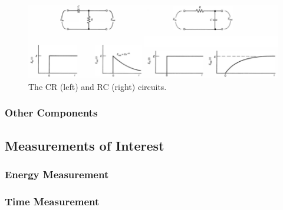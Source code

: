 \begin{figure}[ht]
    \centering
    \includegraphics[width=1.0\textwidth]{images/RC_CR_circuits.png}
    \caption{The CR (left) and RC (right) circuits.}
    \label{fig:RC_CR_circuits}
\end{figure}

\subsubsection{Other Components}

\subsection{Measurements of Interest}
\subsubsection{Energy Measurement}
\subsubsection{Time Measurement}